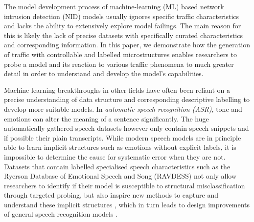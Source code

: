 \documentclass[10pt,conference]{IEEEtran}
\begin{document}
The model development process of machine-learning (ML) based network intrusion detection (NID) models usually ignores specific traffic characteristics and lacks the ability to extensively explore model failings. The main reason for this is likely the lack of precise datasets with specifically curated characteristics and corresponding information. In this paper, we demonstrate how the generation of traffic with controllable and labelled microstructures enables researchers to probe a model and its reaction to various traffic phenomena to much greater detail in order to understand and develop the model's capabilities.

Machine-learning breakthroughs in other fields have often been reliant on a precise understanding of data structure and corresponding descriptive labelling to develop more suitable models.
In \textit{automatic speech recognition (ASR)}, tone and emotions can alter the meaning of a sentence significantly. The huge automatically gathered speech datasets however only contain speech snippets and if possible their plain transcripts. While modern speech models are in principle able to learn implicit structures such as emotions without explicit labels, it is impossible to determine the cause for systematic error when they are not. Datasets that contain labelled specialised speech characteristics such as the Ryerson Database of Emotional Speech and Song (RAVDESS) \cite{livingstone2018ryerson} not only allow researchers to identify if their model is susceptible to structural misclassification through targeted probing, but also inspire new methods to capture and understand these implicit structures \cite{haque2019audio}, which in turn leads to design improvements of general speech recognition models \cite{kamper2020multilingual}.


\end{document}
